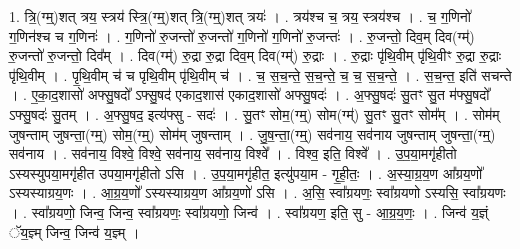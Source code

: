 \documentclass[17pt]{extarticle}
\begin{document}
1. त्रि॒(ग्म्॒)शत् त्रय॒ स्त्रय॑ स्त्रि॒(ग्म्॒)शत् त्रि॒(ग्म्॒)शत् त्रयः॑ । . त्रय॑श्च च॒ त्रय॒ स्त्रय॑श्च । . च॒ ग॒णिनो॑ ग॒णिन॑श्च च ग॒णिनः॑ । . ग॒णिनो॑ रु॒जन्तो॑ रु॒जन्तो॑ ग॒णिनो॑ ग॒णिनो॑ रु॒जन्तः॑ । . रु॒जन्तो॒ दिव॒म् दिव(ग्म्॑) रु॒जन्तो॑ रु॒जन्तो॒ दिव᳚म् । . दिव(ग्म्॑) रु॒द्रा रु॒द्रा दिव॒म् दिव(ग्म्॑) रु॒द्राः । . रु॒द्राः पृ॑थि॒वीम् पृ॑थि॒वीꣳ रु॒द्रा रु॒द्राः पृ॑थि॒वीम् । . पृ॒थि॒वीम् च॑ च पृथि॒वीम् पृ॑थि॒वीम् च॑ । . च॒ स॒च॒न्ते॒ स॒च॒न्ते॒ च॒ च॒ स॒च॒न्ते॒ । . स॒च॒न्त॒ इति॑ सचन्ते । . ए॒का॒द॒शासो॑ अफ्सु॒षदो᳚ ऽफ्सु॒षद॑ एकाद॒शास॑ एकाद॒शासो॑ अफ्सु॒षदः॑ । . अ॒फ्सु॒षदः॑ सु॒तꣳ सु॒त म॑फ्सु॒षदो᳚ ऽफ्सु॒षदः॑ सु॒तम् । . अ॒फ्सु॒षद॒ इत्य॑फ्सु - सदः॑ । . सु॒तꣳ सोम॒(ग्म्॒) सोम(ग्म्॑) सु॒तꣳ सु॒तꣳ सोम᳚म् । . सोम॑म् जुषन्ताम् जुषन्ता॒(ग्म्॒) सोम॒(ग्म्॒) सोम॑म् जुषन्ताम् । . जु॒ष॒न्ता॒(ग्म्॒) सव॑नाय॒ सव॑नाय जुषन्ताम् जुषन्ता॒(ग्म्॒) सव॑नाय । . सव॑नाय॒ विश्वे॒ विश्वे॒ सव॑नाय॒ सव॑नाय॒ विश्वे᳚ । . विश्व॒ इति॒ विश्वे᳚ । . उ॒प॒या॒मगृ॑हीतो ऽस्यस्युपया॒मगृ॑हीत उपया॒मगृ॑हीतो ऽसि । . उ॒प॒या॒मगृ॑हीत॒ इत्यु॑पया॒म - गृ॒ही॒तः॒ । . अ॒स्या॒ग्र॒य॒ण आ᳚ग्रय॒णो᳚ ऽस्यस्याग्रय॒णः । . आ॒ग्र॒य॒णो᳚ ऽस्यस्याग्रय॒ण आ᳚ग्रय॒णो॑ ऽसि । . अ॒सि॒ स्वा᳚ग्रयणः॒ स्वा᳚ग्रयणो ऽस्यसि॒ स्वा᳚ग्रयणः । . स्वा᳚ग्रयणो॒ जिन्व॒ जिन्व॒ स्वा᳚ग्रयणः॒ स्वा᳚ग्रयणो॒ जिन्व॑ । . स्वा᳚ग्रयण॒ इति॒ सु - आ॒ग्र॒य॒णः॒ । . जिन्व॑ य॒ज्ञ्ं ॅय॒ज्ञ्म् जिन्व॒ जिन्व॑ य॒ज्ञ्म् । \newline
\end{document}
